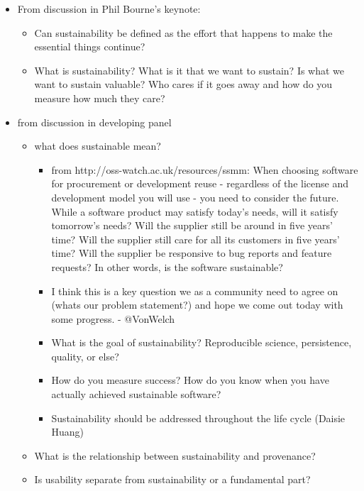 \documentclass[11pt, oneside]{amsart}
\begin{document}
\begin{itemize}

\item From discussion in Phil Bourne's keynote:
\begin{itemize}
\item Can sustainability be defined as the effort that happens to make
  the essential things continue?
\item What is sustainability? What is it that we want to sustain? Is
  what we want to sustain valuable? Who cares if it goes away and how
  do you measure how much they care?
\end{itemize}

\item from discussion in developing panel

\begin{itemize}
\item what does sustainable mean?
\begin{itemize}
\item from http://oss-watch.ac.uk/resources/ssmm: When choosing
  software for procurement or development reuse - regardless of the
  license and development model you will use - you need to consider
  the future. While a software product may satisfy today's needs, will
  it satisfy tomorrow's needs? Will the supplier still be around in
  five years' time? Will the supplier still care for all its customers
  in five years' time? Will the supplier be responsive to bug reports
  and feature requests? In other words, is the software sustainable?
\item I think this is a key question we as a community need to agree
  on (whats our problem statement?) and hope we come out today with
  some progress. - @VonWelch
\item What is the goal of sustainability? Reproducible science,
  persistence, quality, or else?
\item How do you measure success? How do you know when you have
  actually achieved sustainable software?
\item Sustainability should be addressed throughout the life cycle
  (Daisie Huang)
\end{itemize}

\item What is the relationship between sustainability and provenance?

\item Is usability separate from sustainability or a fundamental part?
\end{itemize}


\end{itemize}
\end{document}
